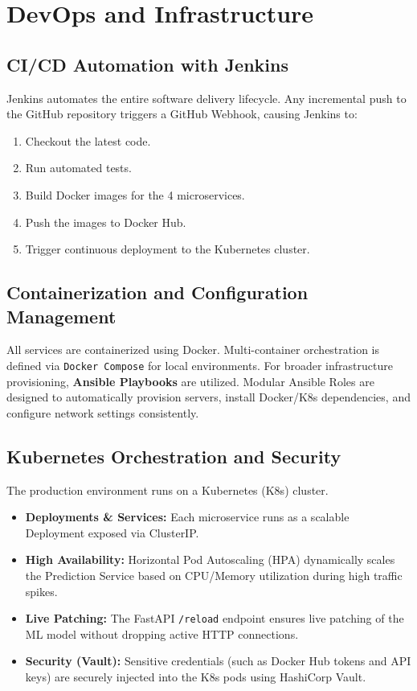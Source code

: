 \documentclass[12pt]{article}
\begin{document}
\section{DevOps and Infrastructure}

\subsection{CI/CD Automation with Jenkins}
Jenkins automates the entire software delivery lifecycle. Any incremental push to the GitHub repository triggers a GitHub Webhook, causing Jenkins to:
\begin{enumerate}
    \item Checkout the latest code.
    \item Run automated tests.
    \item Build Docker images for the 4 microservices.
    \item Push the images to Docker Hub.
    \item Trigger continuous deployment to the Kubernetes cluster.
\end{enumerate}


\subsection{Containerization and Configuration Management}
All services are containerized using Docker. Multi-container orchestration is defined via \texttt{Docker Compose} for local environments. For broader infrastructure provisioning, \textbf{Ansible Playbooks} are utilized. Modular Ansible Roles are designed to automatically provision servers, install Docker/K8s dependencies, and configure network settings consistently.

\subsection{Kubernetes Orchestration and Security}
The production environment runs on a Kubernetes (K8s) cluster. 
\begin{itemize}
    \item \textbf{Deployments \& Services:} Each microservice runs as a scalable Deployment exposed via ClusterIP.
    \item \textbf{High Availability:} Horizontal Pod Autoscaling (HPA) dynamically scales the Prediction Service based on CPU/Memory utilization during high traffic spikes.
    \item \textbf{Live Patching:} The FastAPI \texttt{/reload} endpoint ensures live patching of the ML model without dropping active HTTP connections.
    \item \textbf{Security (Vault):} Sensitive credentials (such as Docker Hub tokens and API keys) are securely injected into the K8s pods using HashiCorp Vault.
\end{itemize}
\end{document}
